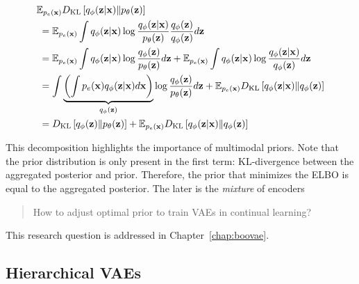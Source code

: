 \begin{equation}\label{eq:intro_elbo_vamp}
\begin{aligned}
&\E_{p_e(\rvx)} \KL{q_{\phi}(\rvz|\rvx)}{p_{\theta}(\rvz)} \\
&\; = \E_{p_e(\rvx)} \int q_{\phi}(\rvz|\rvx) \log \frac{q_{\phi}(\rvz|\rvx)}{p_{\theta}(\rvz)}\frac{q_{\phi}(\rvz)}{q_{\phi}(\rvz)}d\rvz \\
&\; = \E_{p_e(\rvx)} \int q_{\phi}(\rvz|\rvx) \log \frac{q_{\phi}(\rvz)}{p_{\theta}(\rvz)}d\rvz
+ \E_{p_e(\rvx)} \int q_{\phi}(\rvz|\rvx) \log \frac{q_{\phi}(\rvz|\rvx)}{q_{\phi}(\rvz)}d\rvz\\
&\; =  \int\underbrace{\left( \int p_{e}(\rvx) q_{\phi}(\rvz|\rvx)d\rvx\right)}_{q_{\phi}(\rvz)} \log \frac{q_{\phi}(\rvz)}{p_{\theta}(\rvz)}d\rvz
+ \E_{p_e(\rvx)} \KL{q_{\phi}(\rvz|\rvx)}{q_{\phi}(\rvz)} \\
&\; =  \KL{q_{\phi}(\rvz)}{p_{\theta}(\rvz)}
+ \E_{p_e(\rvx)} \KL{q_{\phi}(\rvz|\rvx)}{q_{\phi}(\rvz)} \\
\end{aligned}
\end{equation}

This decomposition highlights the importance of multimodal priors. Note that the prior distribution is only present in the first term: KL-divergence between the aggregated posterior and prior. Therefore, the prior that minimizes the ELBO is equal to the aggregated posterior. The later is the \textit{mixture} of encoders




\begin{quote}
	How  to adjust optimal prior to train VAEs in continual learning?
\end{quote}
This research question is addressed in Chapter~\ref{chap:boovae}.

\subsection{Hierarchical VAEs}



